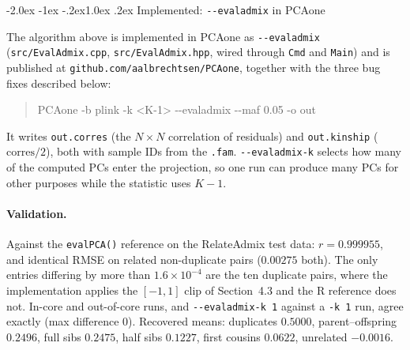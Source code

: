 \documentclass[10pt,a4paper]{article}
\makeatletter
\renewcommand\subsection{\@startsection{subsection}{2}{\z@}%
  {-2.0ex \@plus -1ex \@minus -.2ex}{1.0ex \@plus.2ex}%
  {\normalfont\normalsize\bfseries\color{hdr}}}
\makeatother
\begin{document}
\subsection{Implemented: \texttt{-{}-evaladmix} in PCAone}

The algorithm above is implemented in PCAone as \texttt{-{}-evaladmix}
(\texttt{src/EvalAdmix.cpp}, \texttt{src/EvalAdmix.hpp}, wired through \texttt{Cmd} and \texttt{Main}) and is
published at \texttt{github.com/aalbrechtsen/PCAone}, together with the three bug fixes described below:

\begin{quote}\ttfamily\small
PCAone -b plink -k <K-1> -{}-evaladmix -{}-maf 0.05 -o out
\end{quote}

\noindent
It writes \texttt{out.corres} (the $N\times N$ correlation of residuals) and \texttt{out.kinship}
($\text{corres}/2$), both with sample IDs from the \texttt{.fam}. \texttt{-{}-evaladmix-k} selects how many
of the computed PCs enter the projection, so one run can produce many PCs for other purposes while the
statistic uses $K-1$.

\paragraph{Validation.} Against the \texttt{evalPCA()} reference on the RelateAdmix test data:
$r=0.999955$, and identical RMSE on related non-duplicate pairs ($0.00275$ both). The only entries differing
by more than $1.6\times10^{-4}$ are the ten duplicate pairs, where the implementation applies the
$[-1,1]$ clip of Section~4.3 and the R reference does not. In-core and out-of-core runs, and
\texttt{-{}-evaladmix-k 1} against a \texttt{-k 1} run, agree exactly (max difference $0$).
Recovered means: duplicates $0.5000$, parent--offspring $0.2496$, full sibs $0.2475$, half sibs $0.1227$,
first cousins $0.0622$, unrelated $-0.0016$.
\end{document}

